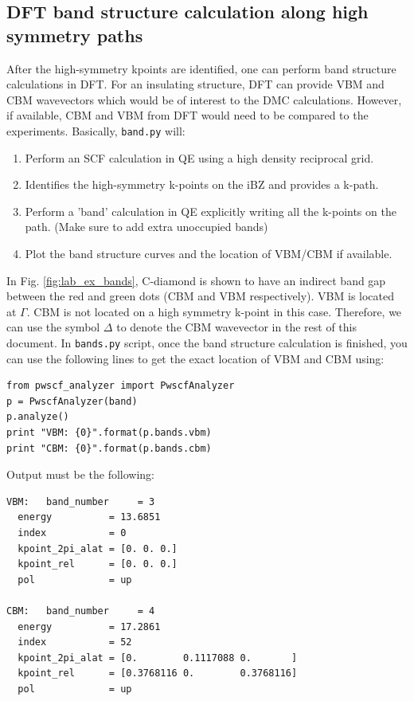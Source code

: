 \subsection{DFT band structure calculation along high symmetry paths}
After the high-symmetry kpoints are identified, one can perform band structure calculations in DFT. 
For an insulating structure, DFT can provide VBM and CBM wavevectors which would be of interest to the DMC calculations. 
However, if available, CBM and VBM from DFT would need to be compared to the experiments.  
Basically,  \texttt{band.py} will:
\begin{enumerate}
	\item Perform an SCF calculation in QE using a high density reciprocal grid.
	\item Identifies the high-symmetry k-points on the iBZ and provides a k-path.
	\item Perform a 'band' calculation in QE explicitly writing all the k-points on the path. (Make sure to add extra unoccupied bands)
	\item Plot the band structure curves and the location of VBM/CBM if available.
\end{enumerate}
In Fig. \ref{fig:lab_ex_bands}, C-diamond is shown to have an indirect band gap between the red and green dots (CBM and VBM respectively). 
VBM is located at $\Gamma$. CBM is not located on a high symmetry k-point in this case. 
Therefore, we can use the symbol $\Delta$ to denote the CBM wavevector in the rest of this document. 
In \texttt{bands.py} script, once the band structure calculation is finished, you can use the following lines to get the exact location of VBM and CBM using:
\begin{lstlisting}
from pwscf_analyzer import PwscfAnalyzer
p = PwscfAnalyzer(band)
p.analyze()
print "VBM: {0}".format(p.bands.vbm)
print "CBM: {0}".format(p.bands.cbm)
\end{lstlisting}
Output must be the following:
\begin{lstlisting}
VBM:   band_number     = 3
  energy          = 13.6851
  index           = 0
  kpoint_2pi_alat = [0. 0. 0.]
  kpoint_rel      = [0. 0. 0.]
  pol             = up

CBM:   band_number     = 4
  energy          = 17.2861
  index           = 52
  kpoint_2pi_alat = [0.        0.1117088 0.       ]
  kpoint_rel      = [0.3768116 0.        0.3768116]
  pol             = up
\end{lstlisting}
